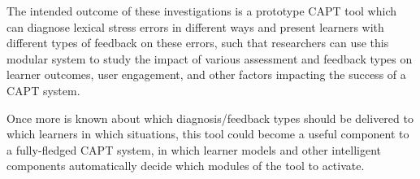 
The intended outcome of these investigations is a prototype CAPT tool %
which can diagnose lexical stress errors in different ways and present learners with different types of feedback on these errors, such that researchers can use this modular system to study the impact of various assessment and feedback types on learner outcomes, user engagement, and other factors impacting the success of a CAPT system. 

%
%		
Once more is known about which diagnosis/feedback types should be delivered to which learners in which situations, this tool could become a useful component to a fully-fledged CAPT system, in which learner models and other intelligent components automatically decide which modules of the tool to activate. %




